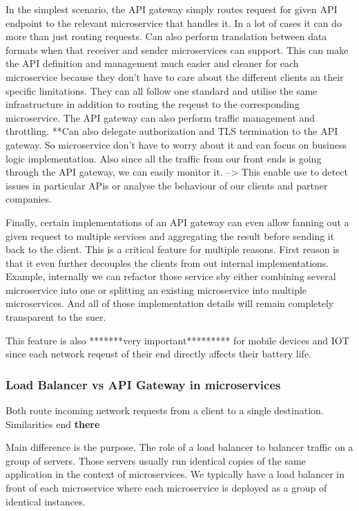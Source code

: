 \documentclass[a4paper, 11pt]{book}
\begin{document}
    In the simplest scenario, the API gateway simply routes request for given API endpoint to the relevant microservice that handles it.
    In a lot of cases it can do more than just routing requests.
    Can also perform translation between data formats when that receiver and sender microservices can support.
    This can make the API definition and management much easier and cleaner for each microservice because they don't have to care about the different clients an their specific limitations.
    They can all follow one standard and utilise the same infrastructure in addition to routing the reqeust to the corresponding microservice.
    The API gateway can also perform traffic management and throttling.
    **Can also delegate authorization and TLS termination to the API gateway.
    So microservice don't have to worry about it and can focus on business logic implementation.
    Also since all the traffic from our front ends is going through the API gateway, we can easily monitor it.
    --> This enable use to detect issues in particular APis or analyse the behaviour of our clients and partner companies.

    Finally, certain implementations of an API gateway can even allow fanning out a given request to multiple services and aggregating the result before sending it back to the client.
    This is a critical feature for multiple reasons.
    First reason is that it even further decouples the clients from out internal implementations.
    Example, internally we can refactor those service sby either combining several microservice into one or splitting an existing microservice into multiple microservices.
    And all of those implementation details will remain completely transparent to the suer.

    This feature is also *******very important********* for mobile devices and IOT since each network reqeust of their end directly affects their battery life.

    \subsubsection{Load Balancer vs API Gateway in microservices}

    Both route incoming network requests from a client to a single destination.
    Similarities end \textbf{there}

    Main difference is the purpose.
    The role of a load balancer to balancer traffic on a group of servers.
    Those servers usually run identical copies of the same application in the context of microservices.
    We typically have a load balancer in front of each microservice where each microservice is deployed as a group of identical instances.
\end{document}
